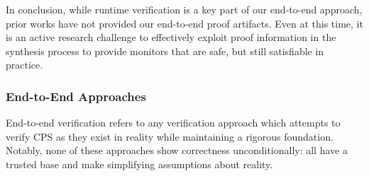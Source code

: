 \documentclass[12pt]{cmuthesis}
\theoremstyle{definition}
\theoremstyle{remark}
\begin{document}
In conclusion, while runtime verification is a key part of our end-to-end approach, prior works have not provided our end-to-end proof artifacts.
Even at this time, it is an active research challenge to effectively exploit proof information in the synthesis process to provide monitors that are safe, but still satisfiable in practice.

\subsubsection{End-to-End Approaches}
\label{sec:end-to-end-relwork}
End-to-end verification refers to any verification approach which attempts to verify CPS as they exist in reality while maintaining a rigorous foundation.
Notably, none of these approaches show correctness unconditionally: all have a trusted base and make simplifying assumptions about reality.
\end{document}
